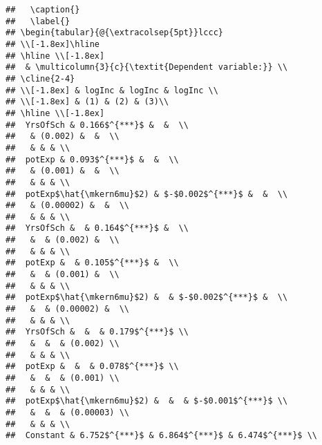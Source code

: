 \documentclass{article}\usepackage[]{graphicx}\usepackage[]{color}
\makeatletter
\newenvironment{kframe}{%
 \def\at@end@of@kframe{}%
 \ifinner\ifhmode%
  \def\at@end@of@kframe{\end{minipage}}%
  \begin{minipage}{\columnwidth}%
 \fi\fi%
 \def\FrameCommand##1{\hskip\@totalleftmargin \hskip-\fboxsep
 \colorbox{shadecolor}{##1}\hskip-\fboxsep
     \hskip-\linewidth \hskip-\@totalleftmargin \hskip\columnwidth}%
 \MakeFramed {\advance\hsize-\width
   \@totalleftmargin\z@ \linewidth\hsize
   \@setminipage}}%
 {\par\unskip\endMakeFramed%
 \at@end@of@kframe}
\newenvironment{knitrout}{}{} %
\makeatother
\begin{document}
\begin{knitrout}
\begin{kframe}
\begin{verbatim}
##   \caption{} 
##   \label{} 
## \begin{tabular}{@{\extracolsep{5pt}}lccc} 
## \\[-1.8ex]\hline 
## \hline \\[-1.8ex] 
##  & \multicolumn{3}{c}{\textit{Dependent variable:}} \\ 
## \cline{2-4} 
## \\[-1.8ex] & logInc & logInc & logInc \\ 
## \\[-1.8ex] & (1) & (2) & (3)\\ 
## \hline \\[-1.8ex] 
##  YrsOfSch & 0.166$^{***}$ &  &  \\ 
##   & (0.002) &  &  \\ 
##   & & & \\ 
##  potExp & 0.093$^{***}$ &  &  \\ 
##   & (0.001) &  &  \\ 
##   & & & \\ 
##  potExp$\hat{\mkern6mu}$2) & $-$0.002$^{***}$ &  &  \\ 
##   & (0.00002) &  &  \\ 
##   & & & \\ 
##  YrsOfSch &  & 0.164$^{***}$ &  \\ 
##   &  & (0.002) &  \\ 
##   & & & \\ 
##  potExp &  & 0.105$^{***}$ &  \\ 
##   &  & (0.001) &  \\ 
##   & & & \\ 
##  potExp$\hat{\mkern6mu}$2) &  & $-$0.002$^{***}$ &  \\ 
##   &  & (0.00002) &  \\ 
##   & & & \\ 
##  YrsOfSch &  &  & 0.179$^{***}$ \\ 
##   &  &  & (0.002) \\ 
##   & & & \\ 
##  potExp &  &  & 0.078$^{***}$ \\ 
##   &  &  & (0.001) \\ 
##   & & & \\ 
##  potExp$\hat{\mkern6mu}$2) &  &  & $-$0.001$^{***}$ \\ 
##   &  &  & (0.00003) \\ 
##   & & & \\ 
##  Constant & 6.752$^{***}$ & 6.864$^{***}$ & 6.474$^{***}$ \\ 

\end{verbatim}
\end{kframe}
\end{knitrout}
\end{document}
